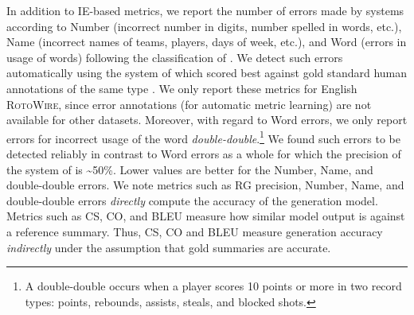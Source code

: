 In addition to IE-based metrics, we report the number of errors made
by systems according to Number (incorrect number in digits, number
spelled in words, etc.), Name (incorrect names of teams, players, days
of week, etc.), and Word (errors in usage of words) following the
classification of \citet{thomson-reiter-2020-gold}. We detect such
errors automatically using the system of \citet{KasnerTextInContext}
which scored best against gold standard human annotations of the same
type \cite{thomson-reiter-2021-generation}.  We only report these
metrics for English \textsc{RotoWire}, since error annotations (for
automatic metric learning) are not available for other datasets.
Moreover, with regard to Word errors, we only report errors for
incorrect usage of the word \textsl{double-double}.\footnote{A
  double-double occurs when a player scores 10 points or more in two
  record types: points, rebounds, assists, steals, and blocked shots.}
We found such errors to be detected reliably in contrast to Word
errors as a whole for which the precision of the system of
\citet{KasnerTextInContext} is \textasciitilde 50\%.  Lower values are
better for the Number, Name, and double-double errors.  We note metrics
such as RG precision, Number, Name, and double-double errors \emph{directly}
compute the accuracy of the generation model. Metrics
such as CS, CO, and BLEU measure how similar model output is against a
reference summary. Thus, CS, CO and BLEU measure generation accuracy
\emph{indirectly} under the assumption that gold summaries are
accurate.

